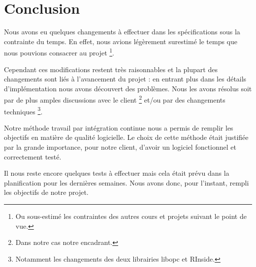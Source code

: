 \documentclass[a4paper,titlepage,french]{report}
\begin{document}
\chapter*{Conclusion}

Nous avons eu quelques changements à effectuer dans les spécifications sous la contrainte du temps.
En effet, nous avions légèrement surestimé le temps que nous pouvions consacrer au projet \footnote{Ou sous-estimé les contraintes des autres cours et projets suivant le point de vue.}.

Cependant ces modifications restent très raisonnables et la plupart des changements sont liés à l'avancement du projet : en entrant plus dans les détails d'implémentation nous avons découvert des problèmes. Nous les avons résolus soit par de plus amples discussions avec le client \footnote{Dans notre cas notre encadrant.} et/ou par des changements techniques \footnote{Notamment les changements des deux librairies libopc et RInside.}.

Notre méthode travail par intégration continue nous a permis de remplir les objectifs en matière de qualité logicielle.
Le choix de cette méthode était justifiée par la grande importance, pour notre client, d'avoir un logiciel fonctionnel et correctement testé.

Il nous reste encore quelques tests à effectuer mais cela était prévu dans la planification pour les dernières semaines.
Nous avons donc, pour l'instant, rempli les objectifs de notre projet.
\end{document}
